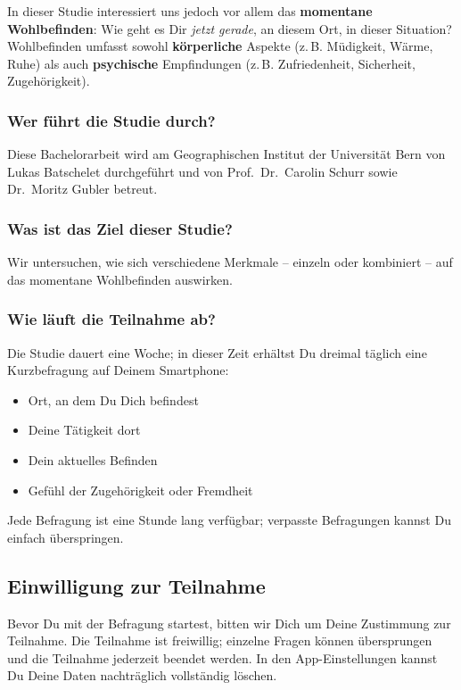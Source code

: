 \begin{appendices}
In dieser Studie interessiert uns jedoch vor allem das \textbf{momentane Wohlbefinden}: Wie geht es Dir \emph{jetzt gerade}, an diesem Ort, in dieser Situation?  
Wohlbefinden umfasst sowohl \textbf{körperliche} Aspekte (z.\,B. Müdigkeit, Wärme, Ruhe) als auch \textbf{psychische} Empfindungen (z.\,B. Zufriedenheit, Sicherheit, Zugehörigkeit).

\subsubsection*{Wer führt die Studie durch?}
Diese Bachelorarbeit wird am Geographischen Institut der Universität Bern von Lukas Batschelet durchgeführt und von Prof.\ Dr.\ Carolin Schurr sowie Dr.\ Moritz Gubler betreut.

\subsubsection*{Was ist das Ziel dieser Studie?}
Wir untersuchen, wie sich verschiedene Merkmale – einzeln oder kombiniert – auf das momentane Wohlbefinden auswirken.

\subsubsection*{Wie läuft die Teilnahme ab?}
Die Studie dauert eine Woche; in dieser Zeit erhältst Du dreimal täglich eine Kurzbefragung auf Deinem Smartphone:

\begin{itemize}\setlength{\itemsep}{0pt}
  \item Ort, an dem Du Dich befindest
  \item Deine Tätigkeit dort
  \item Dein aktuelles Befinden
  \item Gefühl der Zugehörigkeit oder Fremdheit
\end{itemize}

Jede Befragung ist eine Stunde lang verfügbar; verpasste Befragungen kannst Du einfach überspringen.

\hrulefill

\subsection*{Einwilligung zur Teilnahme}
Bevor Du mit der Befragung startest, bitten wir Dich um Deine Zustimmung zur Teilnahme.  
Die Teilnahme ist freiwillig; einzelne Fragen können übersprungen und die Teilnahme jederzeit beendet werden. In den App-Einstellungen kannst Du Deine Daten nachträglich vollständig löschen.


\end{appendices}

